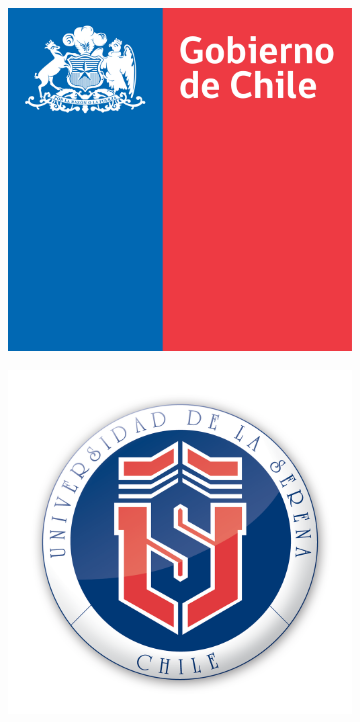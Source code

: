 \documentclass[]{article}
\begin{document}
\begin{titlepage}
\begin{figure}[H]
  \centering
\begin{subfigure}[c]{.2\textwidth}
  \includegraphics[width=\textwidth]{Logo/GOB_RGB.png}
\end{subfigure}
\hfill
\begin{subfigure}[c]{.23\textwidth}
  \includegraphics[width=\textwidth]{Logo/uls.png} 
\end{subfigure}
\end{figure}
\vspace*{4in}


\end{titlepage}
\end{document}
